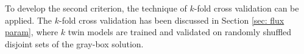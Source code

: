 To develop the second criterion, the technique of $k$-fold cross validation can be applied.
The $k$-fold cross validation has been discussed in Section \ref{sec: flux param}, where
$k$ twin models are trained and validated on randomly shuffled disjoint sets of the
gray-box solution.
